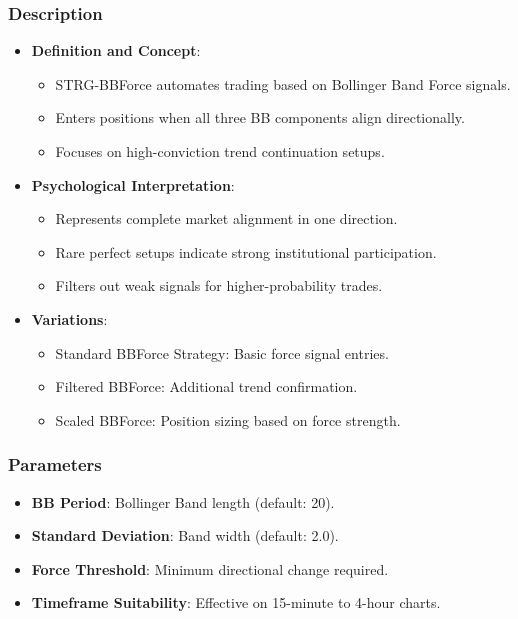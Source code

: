 \documentclass[12pt]{article}
\begin{document}
\subsubsection{Description}
\begin{itemize}
\item \textbf{Definition and Concept}:
  \begin{itemize}
  \item STRG-BBForce automates trading based on Bollinger Band Force signals.
  \item Enters positions when all three BB components align directionally.
  \item Focuses on high-conviction trend continuation setups.
  \end{itemize}
\item \textbf{Psychological Interpretation}:
  \begin{itemize}
  \item Represents complete market alignment in one direction.
  \item Rare perfect setups indicate strong institutional participation.
  \item Filters out weak signals for higher-probability trades.
  \end{itemize}
\item \textbf{Variations}:
  \begin{itemize}
  \item Standard BBForce Strategy: Basic force signal entries.
  \item Filtered BBForce: Additional trend confirmation.
  \item Scaled BBForce: Position sizing based on force strength.
  \end{itemize}
\end{itemize}

\subsubsection{Parameters}
\begin{itemize}
\item \textbf{BB Period}: Bollinger Band length (default: 20).
\item \textbf{Standard Deviation}: Band width (default: 2.0).
\item \textbf{Force Threshold}: Minimum directional change required.
\item \textbf{Timeframe Suitability}: Effective on 15-minute to 4-hour charts.
\end{itemize}
\end{document}
